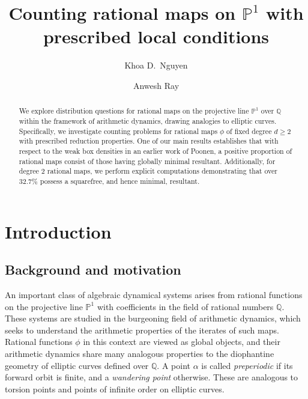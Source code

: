\documentclass[12pt]{amsart}
\newcommand{\Q}{\mathbb{Q}}
\numberwithin{equation}{section}
\begin{document}
\title[Counting rational maps]{Counting rational maps on $\mathbb{P}^1$ with prescribed local conditions}


\author[K.~D.~Nguyen]{Khoa D.~Nguyen}
\address[Nguyen]{Department of Mathematics and Statistics, University of Calgary,
2500 University Drive NW, Calgary, T2N 1N4, Alberta, Canada}

\author[A.~Ray]{Anwesh Ray}
\address[Ray]{Chennai Mathematical Institute, H1, SIPCOT IT Park, Kelambakkam, Siruseri, Tamil Nadu 603103, India}






\begin{abstract}
We explore distribution questions for rational maps on the projective line $\mathbb{P}^1$ over $\mathbb{Q}$ within the framework of arithmetic dynamics, drawing analogies to elliptic curves. Specifically, we investigate counting problems for rational maps $\phi$ of fixed degree $d \geq 2$ with prescribed reduction properties. One of our main results establishes that with respect to the weak box densities in an earlier work of Poonen, a positive proportion of rational maps consist of those having globally minimal resultant. Additionally, for degree 2 rational maps, we perform explicit computations demonstrating that over $32.7\%$ possess a squarefree, and hence minimal, resultant.
\end{abstract}

\maketitle

\section{Introduction}

\subsection{Background and motivation} 
\par An important class of algebraic  dynamical systems arises from rational functions on the projective line $\mathbb{P}^1$ with coefficients in the field of rational numbers $\Q$. These systems are studied in the burgeoning field of arithmetic dynamics, which seeks to understand the arithmetic properties of the iterates of such maps. Rational functions $\phi$ in this context are viewed as global objects, and their arithmetic dynamics share many analogous properties to the diophantine geometry of elliptic curves defined over $\Q$.  
A point $\alpha$ is called \emph{preperiodic} if its forward orbit is finite, and a \emph{wandering point} otherwise. These are analogous to torsion points and points of infinite order on elliptic curves. 
\end{document}
